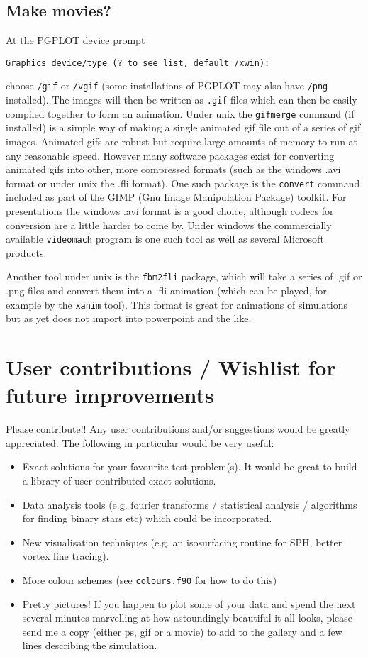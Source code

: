 \documentclass[a4paper,11pt]{article}
\begin{document}
\subsection{Make movies?}
 At the PGPLOT device prompt
\begin{verbatim}
Graphics device/type (? to see list, default /xwin):
\end{verbatim}
choose \verb+/gif+ or \verb+/vgif+ (some installations of PGPLOT may also have \verb+/png+
installed). The images will then be written as \verb+.gif+ files which can then be easily compiled
together to form an animation. Under unix the \verb+gifmerge+ command (if installed) is a simple way
of making a single animated gif file out of a series of gif images. Animated gifs are robust but
require large amounts of memory to run at any reasonable speed. However many software packages exist
for converting animated gifs into other, more compressed formats (such as the windows .avi format or
under unix the .fli format). One such package is the
\verb+convert+ command included as part of the GIMP (Gnu Image Manipulation Package) toolkit.
For presentations the windows .avi format is a good choice, although codecs for conversion are a
little harder to come by. Under windows the commercially available \verb+videomach+ program is one
such tool as well as several Microsoft products.

 Another tool under unix is the \verb+fbm2fli+ package, which will take a series of .gif or .png files and
convert them into a .fli animation (which can be played, for example by the \verb+xanim+ tool). This
format is great for animations of simulations but as yet does not import into powerpoint and the like.

\section{User contributions / Wishlist for future improvements}
 Please contribute!! Any user contributions and/or suggestions would be greatly
appreciated. The following in particular would be very useful:

\begin{itemize}
\item Exact solutions for your favourite test problem(s). It would be great to
build a library of user-contributed exact solutions.
\item Data analysis tools (e.g. fourier transforms / statistical analysis /
algorithms for finding binary stars etc) which could be incorporated.
\item New visualisation techniques (e.g. an isosurfacing routine for SPH, better
vortex line tracing).
\item More colour schemes (see \verb+colours.f90+ for how to do this)
\item Pretty pictures! If you happen to plot some of your data and spend the
next several minutes marvelling at how astoundingly beautiful it all looks, please send
me a copy (either ps, gif or a movie) to add to the gallery and a few lines
describing the simulation.
\end{itemize}
\end{document}
